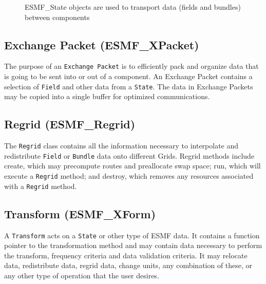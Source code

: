 \begin{figure}
\caption[{ESMF State Role}]{ESMF\_State objects are used to transport data
(fields and bundles) between components}
\label{fig:ESMFSystemDiagram}
\end{figure}

\subsection{Exchange Packet (ESMF\_XPacket)}
\label{sec:xpacket} 
The purpose of an {\tt Exchange Packet} is to efficiently pack and organize 
data that is going to be sent into or out of a component.  An Exchange Packet 
contains a selection of {\tt Field} and other data from a {\tt State}.  
The data in Exchange Packets may be copied into a single buffer for optimized
communications.

\subsection{Regrid (ESMF\_Regrid)}
\label{sec:xpacket} 
The {\tt Regrid} class contains all the information necessary to interpolate
and redistribute {\tt Field} or {\tt Bundle} data onto different Grids.  Regrid
methods include create, which may precompute routes and preallocate swap space;
run, which will execute a {\tt Regrid} method; and destroy, which removes
any resources associated with a {\tt Regrid} method.

\subsection{Transform (ESMF\_XForm)} 
A {\tt Transform} acts on a {\tt State} or other type of 
ESMF data.  It contains a function pointer to the transformation method
and may contain data necessary to perform the transform, frequency 
criteria and data
validation criteria.  It may relocate data, 
redistribute data, regrid data, change units, any combination of these,
or any other type of operation that the user desires.  









